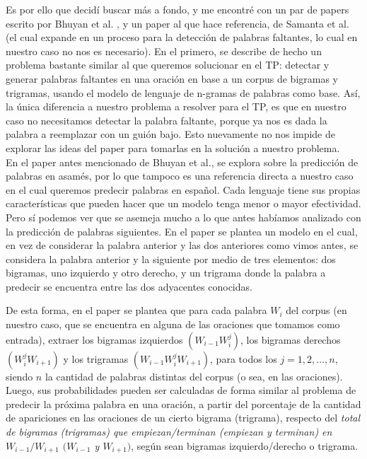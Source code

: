 \documentclass[a4paper]{article}
\begin{document}
Es por ello que decidí buscar más a fondo, y me encontré con un par de papers escrito por Bhuyan et al. \cite{Bhuyan2020}, y un paper al que hace referencia, de Samanta et al. \cite{Samanta2013ASR} (el cual expande en un proceso para la detección de palabras faltantes, lo cual en nuestro caso no nos es necesario). En el primero, se describe de hecho un problema bastante similar al que queremos solucionar en el TP: detectar y generar palabras faltantes en una oración en base a un corpus de bigramas y trigramas, usando el modelo de lenguaje de n-gramas de palabras como base. Así, la única diferencia a nuestro problema a resolver para el TP, es que en nuestro caso no necesitamos detectar la palabra faltante, porque ya nos es dada la palabra a reemplazar con un guión bajo. Esto nuevamente no nos impide de explorar las ideas del paper para tomarlas en la solución a nuestro problema.\\

En el paper antes mencionado de Bhuyan et al.\cite{Bhuyan2020}, se explora sobre la predicción de palabras en asamés, por lo que tampoco es una referencia directa a nuestro caso en el cual queremos predecir palabras en español. Cada lenguaje tiene sus propias características que pueden hacer que un modelo tenga menor o mayor efectividad. Pero sí podemos ver que se asemeja mucho a lo que antes habíamos analizado con la predicción de palabras siguientes. En el paper se plantea un modelo en el cual, en vez de considerar la palabra anterior y las dos anteriores como vimos antes, se considera la palabra anterior y la siguiente por medio de tres elementos: dos bigramas, uno izquierdo y otro derecho, y un trigrama donde la palabra a predecir se encuentra entre las dos adyacentes conocidas.

De esta forma, en el paper se plantea que para cada palabra $W_i$ del corpus (en nuestro caso, que se encuentra en alguna de las oraciones que tomamos como entrada), extraer los bigramas izquierdos $(W_{i-1} W_i^j)$, los bigramas derechos $(W_i^j W_{i+1})$ y los trigramas $(W_{i-1} W_i^j W_{i+1})$, para todos los $j = 1,2,\dots,n$, siendo $n$ la cantidad de palabras distintas del corpus (o sea, en las oraciones). Luego, sus probabilidades pueden ser calculadas de forma similar al problema de predecir la próxima palabra en una oración, a partir del porcentaje de la cantidad de apariciones en las oraciones de un cierto bigrama (trigrama), respecto del \textit{total de bigramas (trigramas) que empiezan/terminan (empiezan y terminan) en $W_{i-1} / W_{i+1}$ $(W_{i-1}$ y $W_{i+1})$}, según sean bigramas izquierdo/derecho o trigrama.
\end{document}
